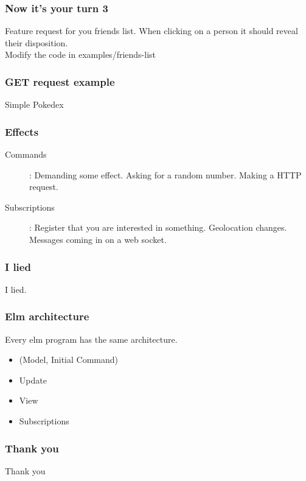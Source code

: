 \documentclass[aspectratio=1610]{beamer}
\begin{document}
\begin{frame}

\frametitle{Now it's your turn 3}
    Feature request for you friends list.
    When clicking on a person it should reveal their disposition.
    \\
    \vspace{1cm}
Modify the code in examples/friends-list
\end{frame}


\begin{frame}
\frametitle{GET request example}

\begin{center}
     \Huge Simple Pokedex
\end{center}

\end{frame}

\begin{frame}
\frametitle{Effects}

    \begin{description}
        \item [Commands        ]  : Demanding some effect. Asking for a random number. Making a HTTP request.
        \item [Subscriptions] : Register that you are interested in something. Geolocation changes. Messages coming in on a web socket.
    \end{description}

\end{frame}


\begin{frame}
\frametitle{I lied}

\begin{center}
     \Huge I lied.
\end{center}

\end{frame}

\begin{frame}
\frametitle{Elm architecture}
     Every elm program has the same architecture.
    \begin{itemize}
      \item (Model, Initial Command)
      \item Update
      \item View
      \item Subscriptions
    \end{itemize}
\end{frame}


\begin{frame}
\frametitle{Thank you}

    \begin{center}
         \Huge Thank you
    \end{center}
\end{frame}



\end{document}
